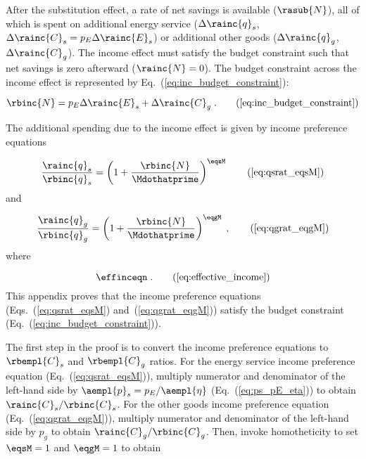 

After the substitution effect, 
a rate of net savings is available ($\rasub{N}$), 
all of which is spent on
additional energy service ($\Delta \rainc{q}_s$, $\Delta \rainc{C}_s = p_E \Delta \rainc{E}_s$) or 
additional other goods ($\Delta \rainc{q}_g$, $\Delta \rainc{C}_g$).
The income effect must satisfy the budget constraint
such that net savings is zero afterward ($\rainc{N} = 0$).
The budget constraint across the income effect 
is represented by Eq.~(\ref{eq:inc_budget_constraint}): 

\begin{equation}
  \rbinc{N} = p_E \Delta \rainc{E}_s + \Delta \rainc{C}_g \; . \tag{\ref{eq:inc_budget_constraint}}
\end{equation}

The additional spending due to the income effect is given by income preference equations

\begin{equation}
  \frac{\rainc{q}_s}{\rbinc{q}_s} = \left( 1 + \frac{\rbinc{N}}{\Mdothatprime}  \right) ^{\eqsM} 
                                                                \tag{\ref{eq:qsrat_eqsM}}
\end{equation}
%
and

\begin{equation}
  \frac{\rainc{q}_g}{\rbinc{q}_g} = \left( 1 + \frac{\rbinc{N}}{\Mdothatprime}  \right) ^{\eqgM} \; ,
                                                                \tag{\ref{eq:qgrat_eqgM}}
\end{equation}
%
where

\begin{equation}
  \effinceqn \; . \tag{\ref{eq:effective_income}}
\end{equation}
%
This appendix proves that the income preference equations 
(Eqs.~(\ref{eq:qsrat_eqsM}) and~(\ref{eq:qgrat_eqgM}))
satisfy the budget constraint (Eq.~(\ref{eq:inc_budget_constraint})).

The first step in the proof is to convert 
the income preference equations
to $\rbempl{C}_s$ and $\rbempl{C}_g$ ratios.
For the energy service income preference equation (Eq.~(\ref{eq:qsrat_eqsM})), 
multiply numerator and denominator of the left-hand side by $\aempl{p}_s = p_E / \aempl{\eta}$
(Eq.~(\ref{eq:ps_pE_eta}))
to obtain $\rainc{C}_s / \rbinc{C}_s$.
For the other goods income preference equation (Eq.~(\ref{eq:qgrat_eqgM})), 
multiply numerator and denominator of the left-hand side by $p_g$
to obtain $\rainc{C}_g / \rbinc{C}_g$.
Then, invoke homotheticity to set $\eqsM = 1$ and $\eqgM = 1$ to obtain

